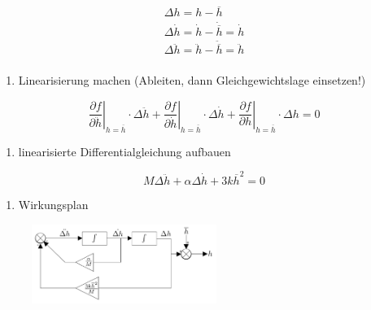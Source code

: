 \documentclass[
  10pt,
  a4paper,
  twocolumn]{article}
\providecommand{\tightlist}{%
  \setlength{\itemsep}{0pt}\setlength{\parskip}{0pt}}\usepackage{longtable,booktabs,array}
\numberwithin{equation}{section}
\begin{document}
\begin{tcolorbox}
\[
\begin{array}{l}
\Delta h = h-\overline{h} \\
\Delta \dot{h} = \dot{h} - \dot{\overline{h}} = \dot{h}\\
\Delta \ddot{h} = \ddot{h} - \ddot{\overline{h}} = \ddot{h} \\
\end{array}
\]

\small

\begin{enumerate}
\def\labelenumi{\arabic{enumi}.}
\setcounter{enumi}{3}
\tightlist
\item
  Linearisierung machen (Ableiten, dann Gleichgewichtslage einsetzen!)
\end{enumerate}

\normalsize

\[
\left.\frac{\partial f}{\partial \ddot{h}}\right\rvert_{h=\overline{h}} \cdot \Delta\ddot{h} + \left.\frac{\partial f}{\partial \dot{h}}\right\rvert_{h=\overline{h}} \cdot \Delta\dot{h} + \left.\frac{\partial f}{\partial h}\right\rvert_{h=\overline{h}} \cdot \Delta{h} = 0
\]

\small

\begin{enumerate}
\def\labelenumi{\arabic{enumi}.}
\setcounter{enumi}{4}
\tightlist
\item
  linearisierte Differentialgleichung aufbauen
\end{enumerate}

\normalsize

\[
M\Delta \ddot{h} + \alpha \Delta \dot{h} + 3 k\overline{h}^2=0
\]

\small

\begin{enumerate}
\def\labelenumi{\arabic{enumi}.}
\setcounter{enumi}{5}
\tightlist
\item
  Wirkungsplan
\end{enumerate}

\normalsize

\begin{figure}[H]

{\centering \includegraphics[width=6cm,height=2.6cm]{images/paste-75.png}

}

\end{figure}

\end{tcolorbox}
\end{document}

